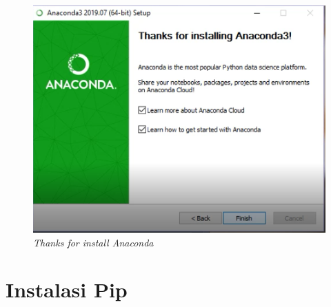 \begin{enumerate}
\begin{figure}[H]
    \centering
    \includegraphics[scale=0.5]{figures/11}
    \caption{\textit{Thanks for install Anaconda}}
    \label{Figureanaconda70}
\end{figure}
\end{enumerate}

\section{Instalasi Pip}
